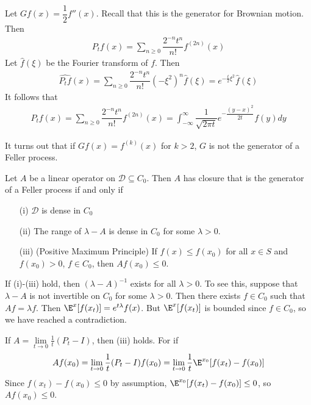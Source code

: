 \begin{exmp}
Let $Gf(x) = \dfrac{1}{2} f''(x)$. Recall that this is the generator for Brownian motion. 
Then 
$$\begin{aligned}
P_t f(x) =  \sum_{n \geq 0} \dfrac{2^{-n}t^{n}}{n!} f^{(2n)}(x) 
\end{aligned}$$
Let $\widehat{f}(\xi)$ be the Fourier transform of $f$. Then
$$\begin{aligned}
\widehat{P_t f}(x) =  \sum_{n \geq 0} \dfrac{2^{-n}t^{n}}{n!} (-\xi^2)^{n} \hat{f}(\xi) = e^{-\frac{t}{2} \xi^2} \widehat{f}(\xi)
\end{aligned}$$
It follows that
$$\begin{aligned}
P_t f(x) =  \sum_{n \geq 0} \dfrac{2^{-n}t^{n}}{n!} f^{(2n)}(x) 
= 
\int_{-\infty}^{\infty} \dfrac{1}{\sqrt{ 2 \pi t }} e^{-\dfrac{ (y-x)^2}{2t}} f(y) dy
\end{aligned}$$
\end{exmp}

It turns out that if $Gf(x) = f^{(k)}(x)$ for $k > 2$, $G$ is not the generator of a Feller process.

\begin{thm}
Let $A$ be a linear operator on $\mathcal{D} \subseteq C_0$.
Then $A$ has closure that is the generator of a Feller process if and only if
\begin{enumerate}
\item[(i)] $\mathcal{D}$ is dense in $C_0$
\item[(ii)] The range of $\lambda - A$ is dense in $C_0$ for some $\lambda > 0$. 
\item[(iii)] (Positive Maximum Principle) If $f(x) \leq f(x_0)$ for all $x \in S$ and $f(x_0) > 0$, $f \in C_0$, then $A f(x_0) \leq 0$.
\end{enumerate}
\end{thm}

\begin{note}
If (i)-(iii) hold, then $(\lambda - A)^{-1}$ exists for all $\lambda > 0$. To see this, suppose that $\lambda - A$ is not invertible on $C_0$ for some $\lambda > 0$. 
Then there exists $f \in C_0$ such that $Af = \lambda f$. Then $\E^x[f(x_t)] =e^{t \lambda} f(x)$. But $\E^x[f(x_t)]$ is bounded since $f \in C_0$, so we have reached a contradiction. 
\end{note}

\begin{note}
If $A = \lim\limits_{t \to 0} \frac{1}{t} (P_t - I)$, then (iii) holds. For if
$$\begin{aligned}
A f(x_0) =  \lim\limits_{t \to 0} \frac{1}{t} (P_t - I) f(x_0) =  \lim_{t \to 0} \frac{1}{t} \E^{x_0} [f(x_t) - f(x_0)]
\end{aligned}$$
Since $f(x_t) - f(x_0) \leq 0$ by assumption, $\E^{x_0} [f(x_t) - f(x_0)] \leq 0$, so $A f(x_0) \leq 0$. 
\end{note}

%

%
